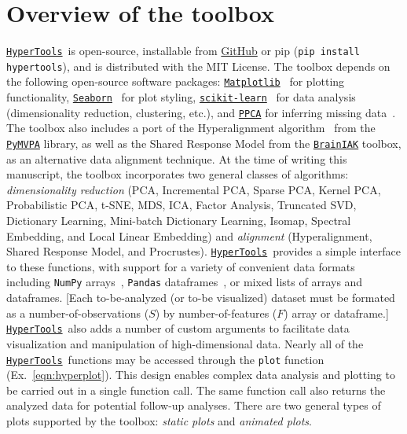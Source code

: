 \documentclass[twoside,11pt]{article}
\newcommand{\hypertools}{\href{https://github.com/ContextLab/hypertools}{\texttt{HyperTools}}}
\begin{document}
\section{Overview of the toolbox}
\hypertools~is open-source, installable from \href{https://github.com/ContextLab/hypertools}{GitHub} or pip (\texttt{pip install hypertools}), and is distributed with the MIT License.
The toolbox depends on the following open-source software packages: \href{http://matplotlib.org/}{\texttt{Matplotlib}}~\citep{Hunt07} for plotting functionality, \href{http://seaborn.pydata.org/}{\texttt{Seaborn}}~\citep{WaskEtal16} for plot styling,  \href{https://github.com/scikit\-learn/scikit\-learn}{\texttt{scikit-learn}}~\citep{PedrEtal11} for data analysis (dimensionality reduction, clustering, etc.), and \href{https://github.com/allentran/pca-magic}{\texttt{PPCA}} for inferring missing data~\citep{TippBish99}.  The toolbox also includes a port of the Hyperalignment algorithm~\citep{HaxbEtal11} from the \href{https://github.com/PyMVPA/PyMVPA}{\texttt{PyMVPA}} library, as well as the Shared Response Model from the \href{https://github.com/IntelPNI/brainiak}{\texttt{BrainIAK}} toolbox, as an alternative data alignment technique. At the time of writing this manuscript, the toolbox incorporates two general classes of algorithms: \textit{dimensionality reduction} (PCA, Incremental PCA, Sparse PCA, Kernel PCA, Probabilistic PCA, t-SNE, MDS, ICA, Factor Analysis, Truncated SVD, Dictionary Learning, Mini-batch Dictionary Learning, Isomap, Spectral Embedding, and Local Linear Embedding) and \textit{alignment} (Hyperalignment, Shared Response Model, and Procrustes).  \hypertools~provides a simple interface to these functions, with support for a variety of convenient data formats including \texttt{NumPy} arrays~\citep{WaltEtal11}, \texttt{Pandas} dataframes~\citep{Mcki10}, or mixed lists of arrays and dataframes.  [Each to-be-analyzed (or to-be visualized) dataset must be formated as a number-of-observations ($S$) by number-of-features ($F$) array or dataframe.] \hypertools~also adds a number of custom arguments to facilitate data visualization and manipulation of high-dimensional data. Nearly all of the \hypertools~functions may be accessed through the \texttt{plot} function (Ex.~\ref{eqn:hyperplot}).  This design enables complex data analysis and plotting to be carried out in a single function call.  The same function call also returns the analyzed data for potential follow-up analyses.  There are two general types of plots supported by the toolbox: \textit{static plots} and \textit{animated plots}.
\end{document}

